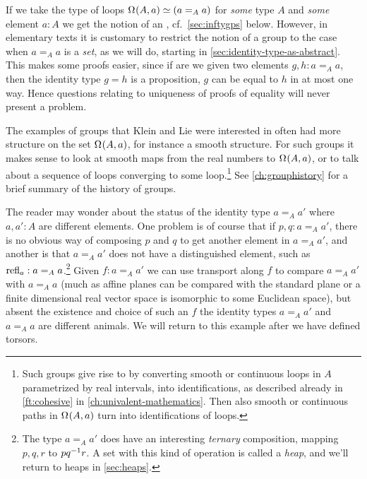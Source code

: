 If we take the type of loops $\loops(A,a) \jdeq (a=_Aa)$
for \emph{some} type $A$ and \emph{some} element $a:A$
we get the notion of an \inftygp, cf.~\cref{sec:inftygps} below.
However, in elementary texts it is customary to restrict the notion of a group to the case when $a=_Aa$ is a \emph{set}, as we will do, starting in \cref{sec:identity-type-as-abstract}.
This makes some proofs easier, since if are we given two elements $g,h:a=_Aa$, then the identity type $g=h$ is a proposition, \ie $g$ can be equal to $h$ in at most one way.  Hence questions relating to uniqueness of proofs of equality will never present a problem.

The examples of groups that Klein and Lie were interested in
often had more structure on the set $\loops(A,a)$,
for instance a smooth structure.
For such groups it makes sense to look at smooth maps from the real numbers
to $\loops(A,a)$,
or to talk about a sequence of loops converging to some loop.\footnote{%
  Such groups give rise to \inftygps by converting
  smooth or continuous loops in $A$
  parametrized by real intervals,
  into identifications,
  as described already in \cref{ft:cohesive}
  in \cref{ch:univalent-mathematics}.
  Then also smooth or continuous paths in $\loops(A,a)$
  turn into identifications of loops.}
See \cref{ch:grouphistory} for a brief summary of the history of groups.

\begin{remark}\label{rem:heap-preview}
  The reader may wonder about the status of the identity type $a=_Aa'$ where $a,a':A$ are different elements.
  One problem is of course that if $p,q:a=_Aa'$,
  there is no obvious way of composing $p$ and $q$
  to get another element in $a=_A a'$,
  and another is that $a=_Aa'$ does not have a distinguished element,
  such as $\mathrm{refl}_{a}:a=_Aa$.\footnote{%
    The type $a=_A a'$ does have an interesting \emph{ternary}
    composition, mapping $p,q,r$ to $pq^{-1}r$.
    A set with this kind of operation is called a \emph{heap},
    and we'll return to heaps in \cref{sec:heaps}.}
Given $f:a=_Aa'$ we can use transport along $f$ to compare $a=_Aa'$ with $a=_Aa$ (much as affine planes can be compared with the standard plane or a finite dimensional real vector space is isomorphic to some Euclidean space), but absent the existence and choice of such an $f$ the identity types $a=_Aa'$ and $a=_Aa$ are different animals.
We will return to this example after we have defined torsors.
\end{remark}



